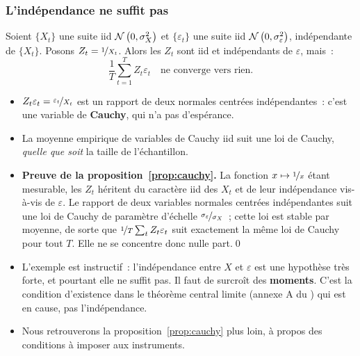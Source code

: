 \documentclass[10pt]{beamer}
\begin{document}
\begin{frame}
  \frametitle{L'indépendance ne suffit pas}

  \begin{prop}\label{prop:cauchy}
    Soient $\{X_t\}$ une suite iid $\mathcal N\left(0,\sigma_X^2\right)$ et $\{\varepsilon_t\}$
    une suite iid $\mathcal N\left(0,\sigma_{\varepsilon}^2\right)$, indépendante de $\{X_t\}$. Posons
    $Z_t = \nicefrac{1}{X_t}$. Alors les $Z_t$ sont iid et indépendants
    de $\varepsilon$, mais~:
    \[
      \frac{1}{T}\sum_{t=1}^{T} Z_t\varepsilon_t \quad\text{ne converge vers rien.}
    \]
  \end{prop}

  \bigskip

  \begin{itemize}

  \item $Z_t\varepsilon_t = \nicefrac{\varepsilon_t}{X_t}$ est un rapport de deux
    normales centrées indépendantes~: c'est une variable de \textbf{Cauchy},
    qui n'a pas d'espérance.\newline

  \item[\dbend] La moyenne empirique de variables de Cauchy iid suit une loi de
    Cauchy, \emph{quelle que soit} la taille de l'échantillon.

  \end{itemize}

\end{frame}


\begin{notes}

  \begin{itemize}

  \item \textbf{Preuve de la proposition~\ref{prop:cauchy}.} La fonction
    $x\mapsto \nicefrac{1}{x}$ étant mesurable, les $Z_t$ héritent du caractère
    iid des $X_t$ et de leur indépendance vis-à-vis de $\varepsilon$. Le rapport
    de deux variables normales centrées indépendantes suit une loi de Cauchy de
    paramètre d'échelle $\nicefrac{\sigma_{\varepsilon}}{\sigma_X}$~; cette loi
    est stable par moyenne, de sorte que
    $\nicefrac{1}{T}\sum_t Z_t\varepsilon_t$ suit exactement la même loi de
    Cauchy pour tout $T$. Elle ne se concentre donc nulle part.\qed\newline

  \item L'exemple est instructif~: l'indépendance entre $X$ et $\varepsilon$ est
    une hypothèse très forte, et pourtant elle ne suffit pas. Il faut de surcroît
    des \textbf{moments}. C'est la condition d'existence dans le théorème central
    limite (annexe A du ) qui est en
    cause, pas l'indépendance.\newline

  \item Nous retrouverons la proposition~\ref{prop:cauchy} plus loin, à propos
    des conditions à imposer aux instruments.

  \end{itemize}

\end{notes}
\end{document}
